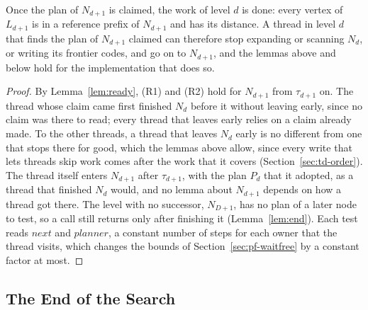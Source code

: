 \begin{lemma}
\label{lem:early}
Once the plan of $N_{d+1}$ is claimed, the work of level $d$ is done: every vertex of $L_{d+1}$ is in a reference prefix of $N_{d+1}$ and has its distance. A thread in level $d$ that finds the plan of $N_{d+1}$ claimed can therefore stop expanding or scanning $N_d$, or writing its frontier codes, and go on to $N_{d+1}$, and the lemmas above and below hold for the implementation that does so.
\end{lemma}
\begin{proof}
By Lemma~\ref{lem:ready}, (R1) and (R2) hold for $N_{d+1}$ from $\tau_{d+1}$ on. The thread whose claim came first finished $N_d$ before it without leaving early, since no claim was there to read; every thread that leaves early relies on a claim already made. To the other threads, a thread that leaves $N_d$ early is no different from one that stops there for good, which the lemmas above allow, since every write that lets threads skip work comes after the work that it covers (Section~\ref{sec:td-order}). The thread itself enters $N_{d+1}$ after $\tau_{d+1}$, with the plan $P_d$ that it adopted, as a thread that finished $N_d$ would, and no lemma about $N_{d+1}$ depends on how a thread got there. The level with no successor, $N_{D+1}$, has no plan of a later node to test, so a call still returns only after finishing it (Lemma~\ref{lem:end}). Each test reads $\mathit{next}$ and $\mathit{planner}$, a constant number of steps for each owner that the thread visits, which changes the bounds of Section~\ref{sec:pf-waitfree} by a constant factor at most.
\end{proof}

\subsection{The End of the Search}
\label{sec:pf-end}

